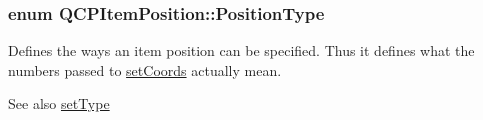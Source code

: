 \subsubsection[{\texorpdfstring{Position\+Type}{PositionType}}]{\setlength{\rightskip}{0pt plus 5cm}enum {\bf Q\+C\+P\+Item\+Position\+::\+Position\+Type}}\hypertarget{classQCPItemPosition_aad9936c22bf43e3d358552f6e86dbdc8}{}\label{classQCPItemPosition_aad9936c22bf43e3d358552f6e86dbdc8}
Defines the ways an item position can be specified. Thus it defines what the numbers passed to \hyperlink{classQCPItemPosition_aa988ba4e87ab684c9021017dcaba945f}{set\+Coords} actually mean.

\begin{DoxySeeAlso}{See also}
\hyperlink{classQCPItemPosition_aa476abf71ed8fa4c537457ebb1a754ad}{set\+Type} 
\end{DoxySeeAlso}
